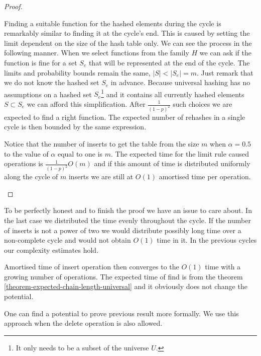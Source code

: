 \begin{proof}
\begin{itemize}
Finding a suitable function for the hashed elements during the cycle is remarkably similar to finding it at the cycle's end. This is caused by setting the limit dependent on the size of the hash table only. We can see the process in the following manner. When we select functions from the family $H$ we can ask if the function is fine for a set $S_e$ that will be represented at the end of the cycle. The limits and probability bounds remain the same, $|S| < |S_e| = m$. Just remark that we do not know the hashed set $S_e$ in advance. Because universal hashing has no assumptions on a hashed set $S_e$\footnote{It only needs to be a subset of the universe $U$.} and it contains all currently hashed elements $S \subset S_e$ we can afford this simplification. After $\frac{1}{(1-p)^2}$ such choices we are expected to find a right function. The expected number of rehashes in a single cycle is then bounded by the same expression. 

Notice that the number of inserts to get the table from the size $m$ when $\alpha = 0.5$ to the value of $\alpha$ equal to one is $m$. The expected time for the limit rule caused operations is $\frac{1}{(1 - p)^2}O(m)$ and if this amount of time is distributed uniformly along the cycle of $m$ inserts we are still at $O(1)$ amortised time per operation.
\end{itemize}
\end{proof}

To be perfectly honest and to finish the proof we have an issue to care about. In the last case we distributed the time evenly throughout the cycle. If the number of inserts is not a power of two we would distribute possibly long time over a non-complete cycle and would not obtain $O(1)$ time in it. In the previous cycles our complexity estimates hold. 

Amortised time of insert operation then converges to the $O(1)$ time with a growing number of operations. The expected time of find is from the theorem \ref{theorem-expected-chain-length-universal} and it obviously does not change the potential.


One can find a potential to prove previous result more formally. We use this approach when the delete operation is also allowed.

